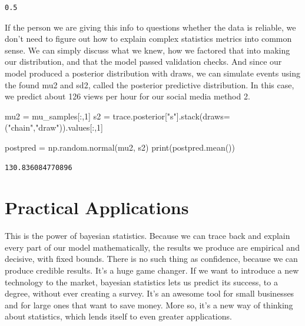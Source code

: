 \documentclass[
  letterpaper,
  DIV=11,
  numbers=noendperiod]{scrartcl}
\newenvironment{Shaded}{\begin{snugshade}}{\end{snugshade}}
\newcommand{\BuiltInTok}[1]{\textcolor[rgb]{0.00,0.23,0.31}{#1}}
\newcommand{\DecValTok}[1]{\textcolor[rgb]{0.68,0.00,0.00}{#1}}
\newcommand{\NormalTok}[1]{\textcolor[rgb]{0.00,0.23,0.31}{#1}}
\newcommand{\OperatorTok}[1]{\textcolor[rgb]{0.37,0.37,0.37}{#1}}
\newcommand{\StringTok}[1]{\textcolor[rgb]{0.13,0.47,0.30}{#1}}
\begin{document}
\begin{verbatim}
0.5
\end{verbatim}

If the person we are giving this info to questions whether the data is
reliable, we don't need to figure out how to explain complex statistics
metrics into common sense. We can simply discuss what we knew, how we
factored that into making our distribution, and that the model passed
validation checks. And since our model produced a posterior distribution
with draws, we can simulate events using the found mu2 and sd2, called
the posterior predictive distribution. In this case, we predict about
126 views per hour for our social media method 2.

\begin{Shaded}
\begin{Highlighting}[]
\NormalTok{mu2 }\OperatorTok{=}\NormalTok{ mu\_samples[:,}\DecValTok{1}\NormalTok{]}
\NormalTok{s2  }\OperatorTok{=}\NormalTok{ trace.posterior[}\StringTok{"s"}\NormalTok{].stack(draws}\OperatorTok{=}\NormalTok{(}\StringTok{"chain"}\NormalTok{,}\StringTok{"draw"}\NormalTok{)).values[:,}\DecValTok{1}\NormalTok{]}

\NormalTok{postpred }\OperatorTok{=}\NormalTok{ np.random.normal(mu2, s2)}
\BuiltInTok{print}\NormalTok{(postpred.mean())}
\end{Highlighting}
\end{Shaded}

\begin{verbatim}
130.836084770896
\end{verbatim}

\section{Practical Applications}\label{practical-applications}

This is the power of bayesian statistics. Because we can trace back and
explain every part of our model mathematically, the results we produce
are empirical and decisive, with fixed bounds. There is no such thing as
confidence, because we can produce credible results. It's a huge game
changer. If we want to introduce a new technology to the market,
bayesian statistics lets us predict its success, to a degree, without
ever creating a survey. It's an awesome tool for small businesses and
for large ones that want to save money. More so, it's a new way of
thinking about statistics, which lends itself to even greater
applications.
\end{document}
